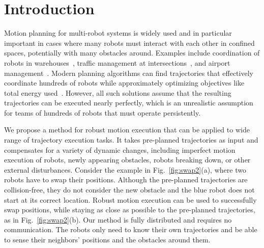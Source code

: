 \documentclass{svproc}
\begin{document}
\section{Introduction}
Motion planning for multi-robot systems is widely used and in particular important in cases where many robots must interact with each other in confined spaces, potentially with many obstacles around.
Examples include coordination of robots in warehouses~\cite{Kiva}, traffic management at intersections~\cite{IntersectionManagementDresner}, and airport management~\cite{AirportTug}.
Modern planning algorithms can find trajectories that effectively coordinate hundreds of robots while approximately optimizing objectives like total energy used~\cite{crazyplanning-ieeetro}.
However, all such solutions assume that the resulting trajectories can be executed nearly perfectly, which is an unrealistic assumption for teams of hundreds of robots that must operate persistently.%

We propose a method for robust motion execution that can be applied to wide range of trajectory execution tasks. It takes pre-planned trajectories as input and compensates for a variety of dynamic changes, including imperfect motion execution of robots, newly appearing obstacles, robots breaking down, or other external disturbances.
Consider the example in Fig.~\ref{fig:swap2}(a), where two robots have to swap their positions.
Although the pre-planned trajectories are collision-free, they do not consider the new obstacle and the blue robot does not start at its correct location.
Robust motion execution can be used to successfully swap positions, while staying as close as possible to the pre-planned trajectories, as in Fig.~\ref{fig:swap2}(b).
Our method is fully distributed and requires no communication. The robots only need to know their own trajectories and be able to sense their neighbors' positions and the obstacles around them.
\end{document}
